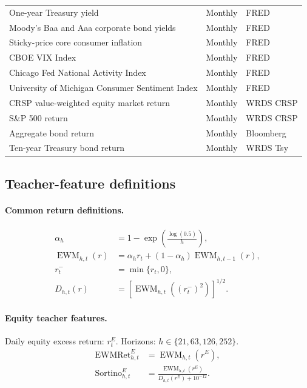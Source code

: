 \begin{longtable}{>{\raggedright\arraybackslash}p{}>{\raggedright\arraybackslash}p{}>{\raggedright\arraybackslash}p{}}
One-year Treasury yield & Monthly & FRED \\
Moody's Baa and Aaa corporate bond yields & Monthly & FRED \\
Sticky-price core consumer inflation & Monthly & FRED \\
CBOE VIX Index & Monthly & FRED \\
Chicago Fed National Activity Index & Monthly & FRED \\
University of Michigan Consumer Sentiment Index & Monthly & FRED \\
CRSP value-weighted equity market return & Monthly & WRDS CRSP \\
S\&P 500 return & Monthly & WRDS CRSP \\
Aggregate bond return & Monthly & Bloomberg \\
Ten-year Treasury bond return & Monthly & WRDS Tsy \\
\bottomrule
\end{longtable}


\subsection{Teacher-feature definitions}
\label{app:teacher-feature-definitions}

\paragraph{Common return definitions.}
\begin{align}
\alpha_h
&=
1-\exp\!\left(\frac{\log(0.5)}{h}\right), \\
\operatorname{EWM}_{h,t}(r)
&=
\alpha_h r_t+(1-\alpha_h)\operatorname{EWM}_{h,t-1}(r), \\
r_t^{-}
&=
\min\{r_t,0\}, \\
D_{h,t}(r)
&=
\left[\operatorname{EWM}_{h,t}\!\left((r_t^{-})^2\right)\right]^{1/2}.
\end{align}

\paragraph{Equity teacher features.}
Daily equity excess return: \(r^E_t\). Horizons: \(h\in\{21,63,126,252\}\).
\begin{align}
\operatorname{EWMRet}^{E}_{h,t}
&=
\operatorname{EWM}_{h,t}(r^E), \\
\operatorname{Sortino}^{E}_{h,t}
&=
\frac{\operatorname{EWM}_{h,t}(r^E)}
{D_{h,t}(r^E)+10^{-12}} .
\end{align}

